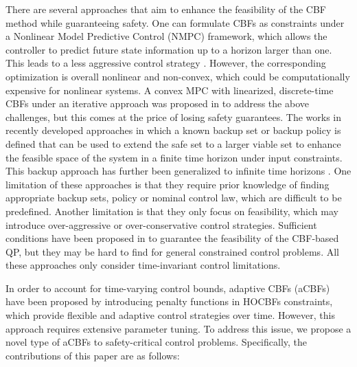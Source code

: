 There are several approaches that aim to enhance the feasibility of the CBF method while guaranteeing safety. One can formulate CBFs as constraints under a Nonlinear Model Predictive Control (NMPC) framework, which allows the controller to predict future state information up to a horizon larger than one. This leads to a less aggressive control strategy \cite{zeng2021enhancing}. However, the corresponding
optimization is overall nonlinear and non-convex, 
which could be computationally expensive for
nonlinear systems. A convex MPC with linearized, discrete-time CBFs under an iterative approach was proposed in \cite{liu2023iterative} to address the above challenges, but this comes at the price of losing safety guarantees. The works in \cite{gurriet2018online,singletary2019online,gurriet2020scalable,chen2021backup} recently developed approaches
in which a known backup set or backup policy is defined that can be used to extend the safe set to a larger viable set
to enhance the feasible space of the system in a finite time horizon
under input constraints. This backup approach has further been generalized to infinite time horizons \cite{squires2018constructive} \cite{breeden2021high}. One limitation of these approaches is that they require prior knowledge of finding appropriate backup sets, policy or nominal control law, which are difficult to be predefined. Another limitation is that they only focus on feasibility, which may introduce over-aggressive or over-conservative control strategies. Sufficient conditions have been proposed in \cite{xiao2022sufficient} to guarantee the feasibility of the CBF-based QP, but they may be hard to find for general constrained control problems. All these approaches only consider time-invariant control limitations.

In order to account for time-varying control bounds, adaptive CBFs (aCBFs) \cite{xiao2021adaptive} have been proposed by
introducing penalty functions in HOCBFs constraints, which provide flexible and adaptive control strategies over time. However, this approach requires extensive parameter tuning. 
To address this issue,
we propose a novel type of aCBFs to safety-critical control problems. Specifically, the contributions of this paper are as follows:

